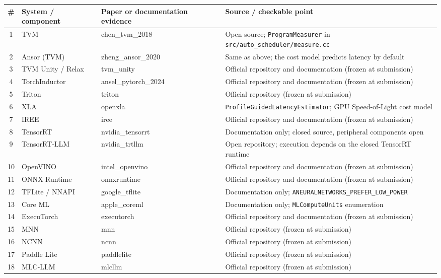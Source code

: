 \documentclass[11pt,a4paper]{article}
\begin{document}
{\scriptsize
\begin{tabularx}{\textwidth}{@{}clXX@{}}
\toprule
\# & System / component & Paper or documentation evidence & Source / checkable point \\
\midrule
1 & TVM & chen\_tvm\_2018 & Open source; \texttt{ProgramMeasurer} in \texttt{src/auto\_scheduler/measure.cc} \\
2 & Ansor (TVM) & zheng\_ansor\_2020 & Same as above; the cost model predicts latency by default \\
3 & TVM Unity / Relax & tvm\_unity & Official repository and documentation (frozen at submission) \\
4 & TorchInductor & ansel\_pytorch\_2024 & Official repository and documentation (frozen at submission) \\
5 & Triton & triton & Official repository (frozen at submission) \\
6 & XLA & openxla & \texttt{ProfileGuidedLatencyEstimator}; GPU Speed-of-Light cost model \\
7 & IREE & iree & Official repository and documentation (frozen at submission) \\
8 & TensorRT & nvidia\_tensorrt & Documentation only; closed source, peripheral components open \\
9 & TensorRT-LLM & nvidia\_trtllm & Open repository; execution depends on the closed TensorRT runtime \\
10 & OpenVINO & intel\_openvino & Official repository and documentation (frozen at submission) \\
11 & ONNX Runtime & onnxruntime & Official repository and documentation (frozen at submission) \\
12 & TFLite / NNAPI & google\_tflite & Documentation only; \texttt{ANEURALNETWORKS\_PREFER\_LOW\_POWER} \\
13 & Core ML & apple\_coreml & Documentation only; \texttt{MLComputeUnits} enumeration \\
14 & ExecuTorch & executorch & Official repository and documentation (frozen at submission) \\
15 & MNN & mnn & Official repository (frozen at submission) \\
16 & NCNN & ncnn & Official repository (frozen at submission) \\
17 & Paddle Lite & paddlelite & Official repository (frozen at submission) \\
18 & MLC-LLM & mlcllm & Official repository (frozen at submission) \\
\bottomrule
\end{tabularx}}
\end{document}
